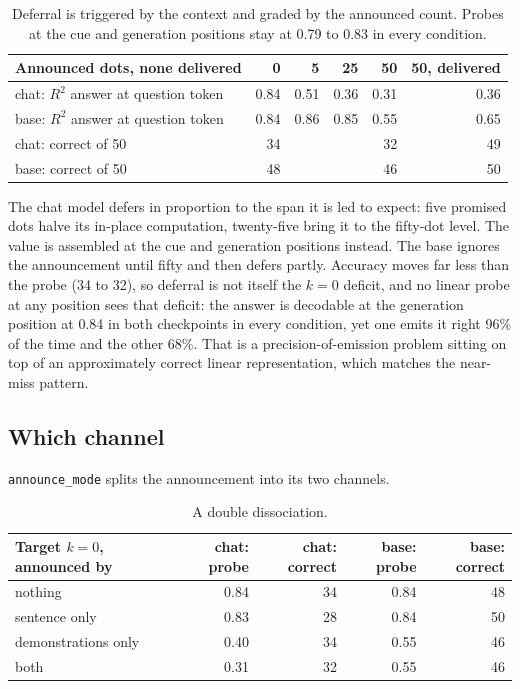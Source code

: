 \documentclass[11pt]{article}
\newcommand{\ttt}[1]{\texttt{\small #1}}
\begin{document}
\begin{table}[h]\centering\small
\begin{tabular}{lrrrrr}\toprule
Announced dots, none delivered & 0 & 5 & 25 & 50 & 50, delivered \\ \midrule
chat: $R^2$ answer at question token & 0.84 & 0.51 & 0.36 & 0.31 & 0.36 \\
base: $R^2$ answer at question token & 0.84 & 0.86 & 0.85 & 0.55 & 0.65 \\
chat: correct of 50 & 34 & & & 32 & 49 \\
base: correct of 50 & 48 & & & 46 & 50 \\ \bottomrule
\end{tabular}
\caption{Deferral is triggered by the context and graded by the announced count. Probes at the cue and generation positions stay at 0.79 to 0.83 in every condition.}\end{table}

The chat model defers in proportion to the span it is led to expect: five promised dots halve its in-place computation, twenty-five bring it to the fifty-dot level. The value is assembled at the cue and generation positions instead. The base ignores the announcement until fifty and then defers partly. Accuracy moves far less than the probe (34 to 32), so deferral is not itself the $k=0$ deficit, and no linear probe at any position sees that deficit: the answer is decodable at the generation position at 0.84 in both checkpoints in every condition, yet one emits it right 96\% of the time and the other 68\%. That is a precision-of-emission problem sitting on top of an approximately correct linear representation, which matches the near-miss pattern.

\subsection{Which channel}

\ttt{announce\_mode} splits the announcement into its two channels.

\begin{table}[h]\centering\small
\begin{tabular}{lrrrr}\toprule
Target $k=0$, announced by & chat: probe & chat: correct & base: probe & base: correct \\ \midrule
nothing & 0.84 & 34 & 0.84 & 48 \\
sentence only & 0.83 & 28 & 0.84 & 50 \\
demonstrations only & 0.40 & 34 & 0.55 & 46 \\
both & 0.31 & 32 & 0.55 & 46 \\ \bottomrule
\end{tabular}
\caption{A double dissociation.}\end{table}
\end{document}
